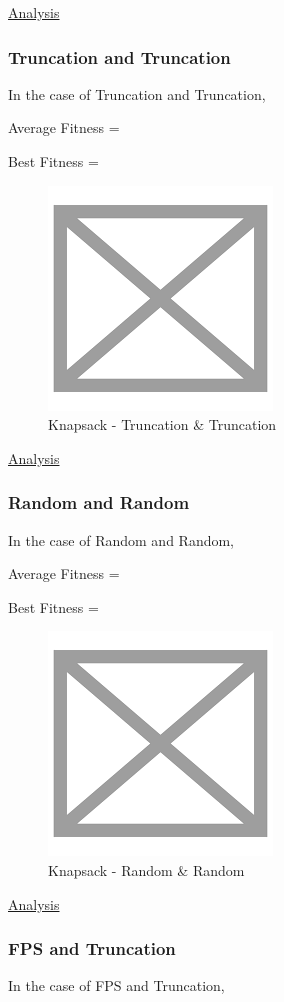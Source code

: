 \documentclass[11pt, letterpaper]{article}
\begin{document}
\underline{Analysis}

\subsubsection {Truncation and Truncation}
In the case of Truncation and Truncation,

Average Fitness = 

Best Fitness = 
\begin{figure}[H]
    \centering
    \includegraphics[scale = 0.6]{images/placeHolder.png}
    \caption {Knapsack - Truncation \& Truncation}
    \label {fig:gcTT}
\end{figure}

\underline{Analysis}
\subsubsection {Random and Random}
In the case of Random and Random,

Average Fitness = 

Best Fitness = 
\begin{figure}[H]
    \centering
    \includegraphics[scale = 0.6]{images/placeHolder.png}
    \caption {Knapsack - Random \& Random}
    \label {fig:gcRR}
\end{figure}

\underline{Analysis}
\subsubsection {FPS and Truncation}
In the case of FPS and Truncation,
\end{document}
